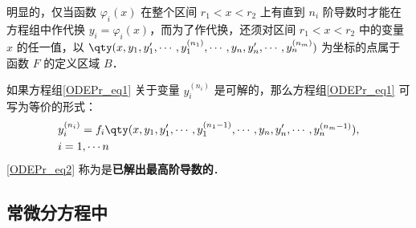 明显的，仅当函数 $\varphi_i(x)$ 在整个区间 $r_1<x<r_2$ 上有直到 $n_i$ 阶导数时才能在方程组中作代换 $y_i=\varphi_i(x)$，而为了作代换，还须对区间 $r_1<x<r_2$ 中的变量 $x$ 的任一值，以 $\qty(x,y_1,y_1',\cdots,y_1^{(n_1)},\cdots,y_n,y_n',\cdots,y_n^{(n_m)})$ 为坐标的点属于函数 $F$ 的定义区域 $B$．

如果方程组\autoref{ODEPr_eq1} 关于变量 $y_i^{(n_i)}$ 是可解的，那么方程组\autoref{ODEPr_eq1} 可写为等价的形式： 
\begin{equation}\label{ODEPr_eq2}
\begin{aligned}
&y_i^{(n_i)}=f_i\qty(x,y_1,y_1',\cdots,y_1^{(n_1-1)},\cdots,y_n,y_n',\cdots,y_n^{(n_m-1)}),\\
& i=1,\cdots n
\end{aligned}
\end{equation}
\autoref{ODEPr_eq2} 称为是\textbf{已解出最高阶导数的}．
\subsection{常微分方程中}